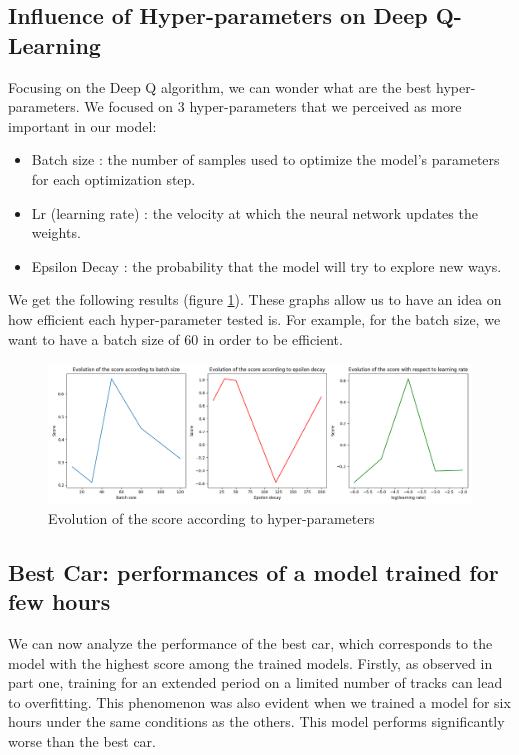 \documentclass[11pt,a4paper]{article}
\newcounter{fig}
\newcommand{\mlist}[1]{\begin{itemize}[noitemsep,topsep=0pt]#1\end{itemize}}
\begin{document}
        
		\subsection*{Influence of Hyper-parameters on Deep Q-Learning}
Focusing on the Deep Q algorithm, we can wonder what are the best hyper-parameters. We focused on $3$ hyper-parameters that we perceived as more important in our model:
\mlist{
\item Batch size : the number of samples used to optimize the model's parameters for each optimization step. 
\item Lr (learning rate) : the velocity at which the neural network updates the weights. 
\item Epsilon Decay : the probability that the model will try to explore new ways. 
}
We get the following results (figure \ref{figure:Evolution of score depending of hyper-parameter}). These graphs allow us to have an idea on how efficient each hyper-parameter tested is. For example, for the batch size, we want to have a batch size of $60$ in order to be efficient.
        \begin{figure}[ht]
            \centering
            \includegraphics[scale = 0.46]{comparaison2.png}
            \caption{Evolution of the score according to hyper-parameters}
            \label{figure:Evolution of score depending of hyper-parameter}
        \end{figure}
        
        
  
		\subsection*{Best Car: performances of a model trained for few hours }
        We can now analyze the performance of the best car, which corresponds to the model with the highest score among the trained models.  
Firstly, as observed in part one, training for an extended period on a limited number of tracks can lead to overfitting. This phenomenon was also evident when we trained a model for six hours under the same conditions as the others.  
This model performs significantly worse than the best car.  
\end{document}
